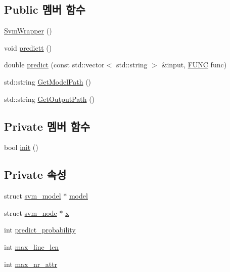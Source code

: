 \subsection*{Public 멤버 함수}
\begin{DoxyCompactItemize}
\item 
\hyperlink{class_svm_wrapper_a81d04cd6c08b9cb263c1f4a7151dd572}{Svm\+Wrapper} ()
\item 
void \hyperlink{class_svm_wrapper_a454766365e910aa34b39dbba67d5caaf}{predictt} ()
\item 
double \hyperlink{class_svm_wrapper_a2f3adec2bc81b6c37416156465485e9c}{predict} (const std\+::vector$<$ std\+::string $>$ \&input, \hyperlink{_svm_wrapper_8h_a2af63b8bc735adf0b29b08f5ff28f3c3}{F\+U\+N\+C} func)
\item 
std\+::string \hyperlink{class_svm_wrapper_aff945103751fb220525ddd4fd102bda1}{Get\+Model\+Path} ()
\item 
std\+::string \hyperlink{class_svm_wrapper_a6401e2559203adaff909ba3862d91ceb}{Get\+Output\+Path} ()
\end{DoxyCompactItemize}
\subsection*{Private 멤버 함수}
\begin{DoxyCompactItemize}
\item 
bool \hyperlink{class_svm_wrapper_af06622d63ce23b77ac29aa29298110d7}{init} ()
\end{DoxyCompactItemize}
\subsection*{Private 속성}
\begin{DoxyCompactItemize}
\item 
struct \hyperlink{structsvm__model}{svm\+\_\+model} $\ast$ \hyperlink{class_svm_wrapper_a2acad681f29bd8269c5b11aa568222ec}{model}
\item 
struct \hyperlink{structsvm__node}{svm\+\_\+node} $\ast$ \hyperlink{class_svm_wrapper_abf0dcde4c2d3ec163b487fdf6cc883bc}{x}
\item 
int \hyperlink{class_svm_wrapper_a18cae78dd4b43d0dc1f2e4d2446b3568}{predict\+\_\+probability}
\item 
int \hyperlink{class_svm_wrapper_a6921acb6aa7fdaf8a784c4e9df839ad1}{max\+\_\+line\+\_\+len}
\item 
int \hyperlink{class_svm_wrapper_ac3f77511deba1c80caa8e7150097d8d6}{max\+\_\+nr\+\_\+attr}
\end{DoxyCompactItemize}
